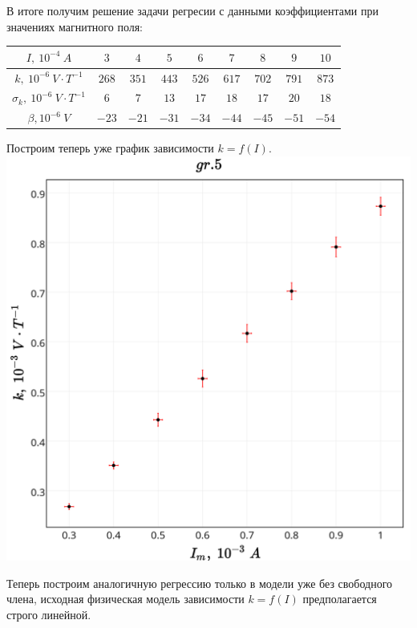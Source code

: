 В итоге получим решение задачи регресии с данными коэффициентами при значениях магнитного поля:

\begin{center}
\begin{tabular}{|c|*{8}{c|}}
\hline
{$I,~10^{-4}~A$} & $3$ &  $4$ & $5$ & $6$ & $7$ & $8$ & $9$ & $10$  \\
\hline
{$k,~10^{-6}~V\cdot T^{-1}$} & $268$ &  $351$ & $443$ & $526$ & $617$ & $702$ & $791$ & $873$ \\
\hline
{$\sigma_k,~10^{-6}~V\cdot T^{-1}$} & $6$ &  $7$ & $13$ & $17$ & $18$ & $17$ & $20$ & $18$\\
\hline
{$\beta, 10^{-6}~V$} & $-23$ &  $-21$ & $-31$ & $-34$ & $-44$ & $-45$ & $-51$ & $-54$ \\
\hline
\end{tabular}
\end{center}

Построим теперь уже график зависимости $k = f(I)$.\\

\includegraphics[scale = 0.20]{my_plot5.png}

Теперь построим аналогичную регрессию только в модели уже без свободного члена, исходная физическая модель зависимости $k = f(I)$ предполагается строго линейной. 

